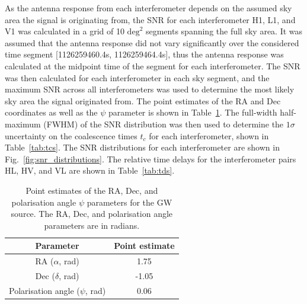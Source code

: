 \documentclass[11pt,a4paper]{article}
\begin{document}
As the antenna response from each interferometer depends on the assumed sky area the signal is originating from, the SNR for each interferometer H1, L1, and V1 was calculated in a grid of 10 $\mathrm{deg}^2$ segments spanning the full sky area. It was assumed that the antenna response did not vary significantly over the considered time segment [1126259460.4s, 1126259464.4s], thus the antenna response was calculated at the midpoint time of the segment for each interferometer. The SNR was then calculated for each interferometer in each sky segment, and the maximum SNR across all interferometers was used to determine the most likely sky area the signal originated from. The point estimates of the RA and Dec coordinates as well as the $\psi$ parameter is shown in Table~\ref{tab:point_estimate}. The full-width half-maximum (FWHM) of the SNR distribution was then used to determine the $1\sigma$ uncertainty on the coalescence times $t_c$ for each interferometer, shown in Table~\ref{tab:tcs}. The SNR distributions for each interferometer are shown in Fig.~\ref{fig:snr_distributions}. The relative time delays for the interferometer pairs HL, HV, and VL are shown in Table~\ref{tab:tds}.

\begin{table}[h]
    \centering
    \begin{tabular}{c|c}
    Parameter & Point estimate \\
    \hline
    RA ($\alpha$, rad) & 1.75 \\
    Dec ($\delta$, rad) & -1.05 \\
    Polarisation angle ($\psi$, rad) & 0.06 \\
    \end{tabular}
    \caption{Point estimates of the RA, Dec, and polarisation angle $\psi$ parameters for the GW source. The RA, Dec, and polarisation angle parameters are in radians.}
    \label{tab:point_estimate}
\end{table}
\end{document}
